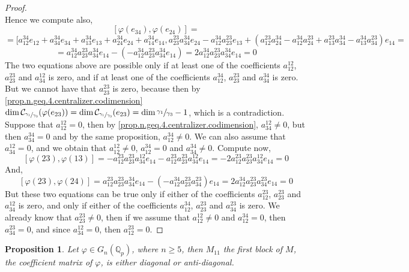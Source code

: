 \documentclass[12pt,fleqn]{article}
\newtheorem{proposition}[theorem]{Proposition}
\begin{document}
\begin{proof}
\[\]
Hence we compute also,
\[
[\varphi(e_{34}),\varphi(e_{24})]=\]\[=[a_{12}^{34}e_{12}+a_{34}^{34}e_{34}+a_{13}^{34}e_{13}+a_{24}^{34}e_{24}+a_{14}^{34}e_{14},a_{23}^{23}a_{34}^{34}e_{24}-a_{12}^{34}a_{23}^{23}e_{13}+(a_{12}^{23}a_{24}^{34}-a_{12}^{34}a_{24}^{23}+a_{13}^{23}a_{34}^{34}-a_{13}^{34}a_{34}^{23})e_{14}=\]\[=a_{12}^{34}a_{23}^{23}a_{34}^{34}e_{14}-(-a_{12}^{34}a_{23}^{23}a_{34}^{34}e_{14})=2 a_{12}^{34}a_{23}^{23}a_{34}^{34}e_{14}=0
\]
The two equations above are possible only if at least one of the coefficients $a_{12}^{12}$, $a_{23}^{23}$ and $a_{34}^{12}$ is zero, and if at least one of the coefficients $a_{12}^{34}$, $a_{23}^{23}$ and $a_{34}^{34}$ is zero. But we cannot have that $a_{23}^{23}$ is zero, because then by \ref{prop.n.geq.4.centralizer.codimension} $\dim\mathcal{C}_{\sfrac{\gamma_1}{\gamma_3}}(\varphi(e_{23}))=\dim\mathcal{C}_{\sfrac{\gamma_1}{\gamma_3}}(e_{23})=\dim\sfrac{\gamma_1}{\gamma_3}-1$, which is a contradiction. Suppose that $a_{12}^{12}=0$, then by \ref{prop.n.geq.4.centralizer.codimension}, $a_{34}^{12}\neq 0$, but then $a_{34}^{34}=0$ and by the same proposition, $a_{12}^{34}\neq 0$. We can also assume that $a_{34}^{12}=0$, and we obtain that $a_{12}^{12}\neq 0$, $a_{12}^{34}=0$ and $a_{34}^{34}\neq 0$. Compute now, \[
[\varphi(23),\varphi(13)]=-a_{12}^{23}a_{23}^{23}a_{34}^{12}e_{14}-a_{12}^{23}a_{23}^{23}a_{34}^{12}e_{14}=-2a_{12}^{23}a_{23}^{23}a_{34}^{12}e_{14}=0
\]
And,\[
[\varphi(23),\varphi(24)]=a_{12}^{23}a_{23}^{23}a_{34}^{34}e_{14}-(-a_{12}^{34}a_{23}^{23}a_{34}^{23})e_{14}=2a_{12}^{34}a_{23}^{23}a_{34}^{23}e_{14}=0
\]
But these two equations can be true only if either of the coefficients $a_{12}^{23}$, $a_{23}^{23}$ and $a_{34}^{12}$ is zero, and only if either of the coefficients $a_{12}^{34}$, $a_{23}^{23}$ and $a_{34}^{23}$ is zero. We already know that $a_{23}^{23}\neq 0$, then if we assume that $a_{12}^{12}\neq 0$ and $a_{12}^{34}=0$, then $a_{34}^{23}=0$, and since $a_{34}^{12}=0$, then $a_{12}^{23}=0$.
\end{proof}
\begin{proposition}
\label{m11.n.5}
Let $\varphi\in G_n(\mathbb{Q}_p)$, where $n\geq 5$, then $M_{11}$ the first block of $M$, the coefficient matrix of $\varphi$, is either diagonal or anti-diagonal.
\end{proposition}
\end{document}

